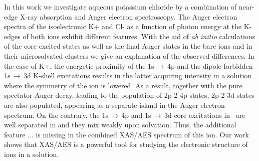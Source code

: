 In this work we investigate aqueous potassium chloride by a combination of near-edge X-ray absorption and Auger electron spectroscopy. The Auger electron spectra of the isoelectronic K+ and Cl- as a function of photon energy at the K-edges of both ions exhibit different features. With the aid of {\it ab initio} calculations of the core excited states as well as the final Auger states in the bare ions and in their microsolvated clusters we give an explanation of the observed differences. In the case of K+, the energetic proximity of the 1s$\,\rightarrow\,$4p and the dipole-forbidden 1s$\,\rightarrow\,$3d K-shell excitations results in the latter acquiring intensity in a solution where the symmetry of the ion is lowered. As a result, together with the pure spectator Auger decay, leading to the population of 2p-2 4p states, 2p-2 3d states are also populated, appearing as a separate island in the Auger electron spectrum. On the contrary, the 1s$\,\rightarrow\,$4p and 1s$\,\rightarrow\,$3d core excitations in \cli~are well separated in and they mix weakly upon solvation. Thus, the additional feature ... is missing in the combined XAS/AES spectrum of this ion. Our work shows that XAS/AES is a powerful tool for studying the electronic structure of ions in a solution.